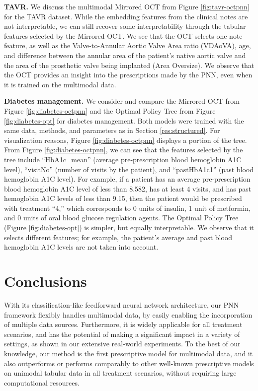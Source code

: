 \documentclass[10pt]{article} %
\begin{document}
\textbf{TAVR.} We discuss the multimodal Mirrored OCT from Figure \ref{fig:tavr-octpnn} for the TAVR dataset. While the embedding features from the clinical notes are not interpretable, we can still recover some interpretability through the tabular features selected by the Mirrored OCT. We see that the OCT selects one note feature, as well as the Valve-to-Annular Aortic Valve Area ratio (VDAoVA), age, and difference between the annular area of the patient's native aortic valve and the area of the prosthetic valve being implanted (Area Oversize). We observe that the OCT provides an insight into the prescriptions made by the PNN, even when it is trained on the multimodal data.

\textbf{Diabetes management.} We consider and compare the Mirrored OCT from Figure \ref{fig:diabetes-octpnn} and the Optimal Policy Tree from Figure \ref{fig:diabetes-opt} for diabetes management. Both models were trained with the same data, methods, and parameters as in Section \ref{res:structured}. For visualization reasons, Figure \ref{fig:diabetes-octpnn} displays a portion of the tree. From Figure \ref{fig:diabetes-octpnn}, we can see that the features selected by the tree include ``HbA1c\_mean'' (average pre-prescription blood hemoglobin A1C level), ``visitNo'' (number of visits by the patient), and ``pastHbA1c1'' (past blood hemoglobin A1C level). For example, if a patient has an average pre-prescription blood hemoglobin A1C level of less than 8.582, has at least 4 visits, and has past hemoglobin A1C levels of less than 9.15, then  the patient would be prescribed with treatment ``4,'' which corresponds to 0 units of insulin, 1 unit of metformin, and 0 units of oral blood glucose regulation agents. The Optimal Policy Tree (Figure \ref{fig:diabetes-opt}) is simpler, but equally interpretable. We observe that it selects different features; for example, the patient's average and past blood hemoglobin A1C levels are not taken into account. 

\section{Conclusions}
With its classification-like feedforward neural network architecture, our PNN framework flexibly handles multimodal data, by easily enabling the incorporation of multiple data sources. Furthermore, it is widely applicable for all treatment scenarios, and has the potential of making a significant impact in a variety of settings, as shown in our extensive real-world experiments. To the best of our knowledge, our method is the first prescriptive model for multimodal data, and it also outperforms or performs comparably to other well-known prescriptive models on unimodal tabular data in all treatment scenarios, without requiring large computational resources. 
\end{document}
